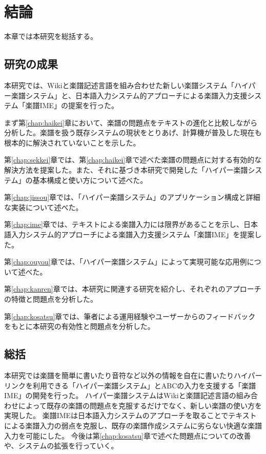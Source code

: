 \chapter{結論}
\label{chap:kekka}

本章では本研究を総括する。

\newpage

\section{研究の成果}
本研究では、Wikiと楽譜記述言語を組み合わせた新しい楽譜システム「ハイパー楽譜システム」と、日本語入力システム的アプローチによる楽譜入力支援システム「楽譜IME」の提案を行った。

まず第\ref{chap:haikei}章において、楽譜の問題点をテキストの進化と比較しながら分析した。楽譜を扱う既存システムの現状をとりあげ、計算機が普及した現在も根本的に解決されていないことを示した。

第\ref{chap:sekkei}章では、第\ref{chap:haikei}章で述べた楽譜の問題点に対する有効的な解決方法を提案した。また、それに基づき本研究で開発した「ハイパー楽譜システム」の基本構成と使い方について述べた。

第\ref{chap:jissou}章では、「ハイパー楽譜システム」のアプリケーション構成と詳細な実装について述べた。

第\ref{chap:ime}章では、テキストによる楽譜入力には限界があることを示し、日本語入力システム的アプローチによる楽譜入力支援システム「楽譜IME」を提案した。

第\ref{chap:ouyou}章では、「ハイパー楽譜システム」によって実現可能な応用例について述べた。

第\ref{chap:kanren}章では、本研究に関連する研究を紹介し、それぞれのアプローチの特徴と問題点を分析した。

第\ref{chap:kosatsu}章では、筆者による運用経験やユーザーからのフィードバックをもとに本研究の有効性と問題点を分析した。

\section{総括}
本研究では楽譜を簡単に書いたり音符など以外の情報を自在に書いたりハイパーリンクを利用できる「ハイパー楽譜システム」とABCの入力を支援する「楽譜IME」の開発を行った。
ハイパー楽譜システムはWikiと楽譜記述言語の組み合わせによって既存の楽譜の問題点を克服するだけでなく、新しい楽譜の使い方を実現した。
楽譜IMEは日本語入力システムのアプローチを取ることでテキストによる楽譜入力の弱点を克服し、既存の楽譜作成システムに劣らない快適な楽譜入力を可能にした。
今後は第\ref{chap:kosatsu}章で述べた問題点についての改善や、システムの拡張を行っていく。